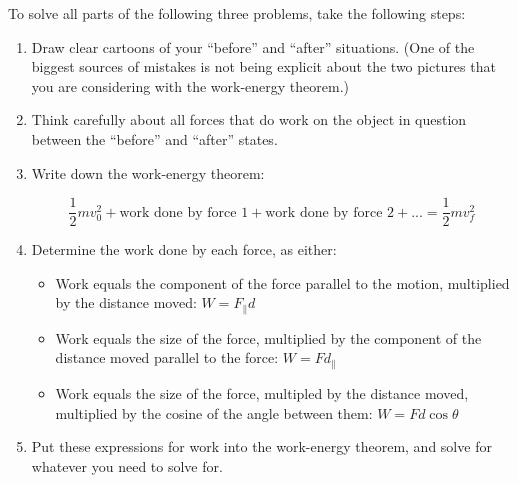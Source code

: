\documentclass[12pt]{article}
\begin{document}
\newpage

To solve all parts of the following three problems, take the following steps:

\begin{enumerate}
	\item Draw clear cartoons of your ``before'' and ``after'' situations. (One of the biggest sources of mistakes is not being explicit about the two pictures that you are considering with the work-energy theorem.)
	\item Think carefully about all forces that do work on the object in question between the ``before'' and ``after'' states.
	\item Write down the work-energy theorem:
	
	$$\frac{1}{2}mv_0^2 + \text{work done by force 1} + \text{work done by force 2} + ... = \frac{1}{2}mv_f^2$$
	
	\item Determine the work done by each force, as either:
	\begin{itemize}
		\item Work equals the component of the force parallel to the motion, multiplied by the distance moved: $W = F_\parallel d$
		\item Work equals the size of the force, multiplied by the component of the distance moved parallel to the force: $W = F d_\parallel$
		\item Work equals the size of the force, multipled by the distance moved, multiplied by the cosine of the angle between them: $W = F d \cos \theta$
	\end{itemize}
	
	\item Put these expressions for work into the work-energy theorem, and solve for whatever you need to solve for.
\end{enumerate}

\newpage
\end{document}

